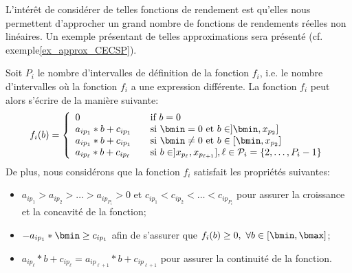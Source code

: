 L'intérêt de considérer de telles fonctions de rendement est qu'elles
nous permettent d'approcher un grand nombre de fonctions de
rendements réelles non linéaires. Un exemple présentant de telles
approximations sera présenté (cf. exemple\ref{ex_approx_CECSP}). 


Soit $P_i$ le nombre d'intervalles de définition de la fonction
$f_i$, i.e. le nombre d'intervalles où la fonction $f_i$ a une
expression différente. La fonction $f_i$ peut alors s'écrire de la
manière suivante:  
\[f_i(b)=\left\{
    \begin{array}{ll}
      0 & \quad \text{if }b=0\\
      a_{ip_1}*b+c_{ip_1} &\quad \text{si }\bmin=0\text{ et }b \in ]\bmin,x_{p_2}] \\
      a_{ip_1}*b+c_{ip_1} &\quad \text{si }\bmin\neq 0 \text{ et }b \in
                            [\bmin,x_{p_2}] \\
      a_{ip_\ell}*b+c_{ip_\ell} &\quad \text{si } b \in
                                  ]x_{p_\ell},x_{p_{\ell+1}}], \ell \in \P_i=\{2,\dots,P_i-1\} 
    \end{array}
  \right.\]
De plus, nous considérons que la fonction $f_i$ satisfait les
propriétés suivantes: 
\begin{itemize}
\item $a_{ip_1} >a_{ip_2} > \dots > a_{ip_{P_i}}>0$ et $c_{ip_1}
  <c_{ip_2} < \dots < c_{ip_{P_i}}$ pour assurer la croissance et la
  concavité de la fonction; 
\item $-a_{ip_1}*\bmin \ge c_{ip_1}$  afin de s'assurer que $f_i(b) \ge
  0,\ \forall b \in [\bmin,\bmax]$;
\item $a_{ip_\ell}*b+c_{ip_\ell}=a_{ip_{\ell+1}}*b+c_{ip_{\ell+1}}$
  pour assurer la continuité de la fonction.
\end{itemize}

